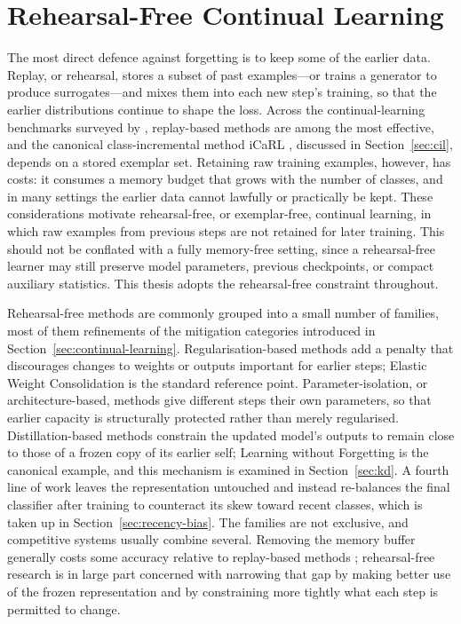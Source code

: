 \section{Rehearsal-Free Continual Learning}
\label{sec:rehearsal-free}

The most direct defence against forgetting is to keep some of the earlier
data. Replay, or rehearsal, stores a subset of past examples---or trains a
generator to produce surrogates---and mixes them into each new step's
training, so that the earlier distributions continue to shape the loss.
Across the continual-learning benchmarks surveyed by \cite{delange2022continual},
replay-based methods are among the most effective, and the
canonical class-incremental method iCaRL \parencite{rebuffi2017icarl}, discussed
in Section~\ref{sec:cil}, depends on a stored exemplar set. Retaining raw training
examples, however, has costs: it consumes a memory budget that grows with
the number of classes, and in many settings the earlier data cannot
lawfully or practically be kept. These considerations motivate
rehearsal-free, or exemplar-free, continual learning, in which raw examples
from previous steps are not retained for later training. This should not be
conflated with a fully memory-free setting, since a rehearsal-free learner
may still preserve model parameters, previous checkpoints, or compact
auxiliary statistics. This thesis adopts the rehearsal-free constraint
throughout.

Rehearsal-free methods are commonly grouped into a small number of
families, most of them refinements of the mitigation categories introduced
in Section~\ref{sec:continual-learning}. Regularisation-based methods add a penalty that discourages
changes to weights or outputs important for earlier steps; Elastic Weight
Consolidation \parencite{kirkpatrick2017overcoming} is the standard reference point.
Parameter-isolation, or architecture-based, methods give different steps
their own parameters, so that earlier capacity is structurally protected
rather than merely regularised. Distillation-based methods constrain the
updated model's outputs to remain close to those of a frozen copy of its
earlier self; Learning without Forgetting \parencite{li2016learning} is the
canonical example, and this mechanism is examined in Section~\ref{sec:kd}. A fourth
line of work leaves the representation untouched and instead re-balances the
final classifier after training to counteract its skew toward recent
classes, which is taken up in Section~\ref{sec:recency-bias}. The families are not exclusive,
and competitive systems usually combine several. Removing the memory buffer
generally costs some accuracy relative to replay-based methods \parencite{delange2022continual};
rehearsal-free research is in large part concerned with
narrowing that gap by making better use of the frozen representation and by
constraining more tightly what each step is permitted to change.

